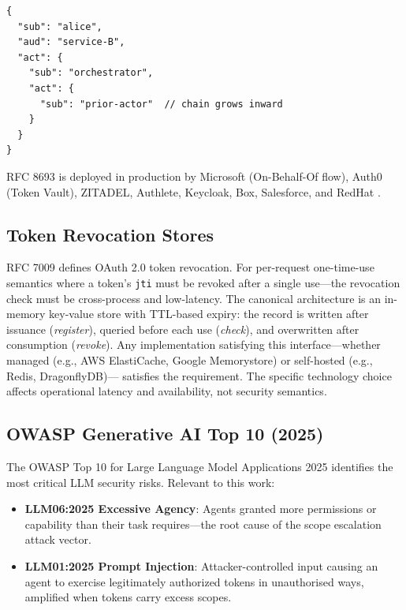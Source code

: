 \documentclass[journal]{IEEEtran}
\begin{document}
\begin{lstlisting}[language={},caption={Nested act claim per RFC 8693 \S 4.1},
                   label={lst:actchain}]
{
  "sub": "alice",
  "aud": "service-B",
  "act": {
    "sub": "orchestrator",
    "act": {
      "sub": "prior-actor"  // chain grows inward
    }
  }
}
\end{lstlisting}

RFC 8693 is deployed in production by Microsoft (On-Behalf-Of flow), Auth0
(Token Vault), ZITADEL, Authlete, Keycloak, Box, Salesforce, and
RedHat \cite{rfc8693_deploy}.

\subsection{Token Revocation Stores}

RFC 7009 \cite{rfc7009} defines OAuth 2.0 token revocation. For per-request
one-time-use semantics where a token's \texttt{jti} must be revoked after a
single use---the revocation check must be cross-process and low-latency. The
canonical architecture is an in-memory key-value store with TTL-based expiry:
the record is written after issuance (\textit{register}), queried before each
use (\textit{check}), and overwritten after consumption (\textit{revoke}). Any
implementation satisfying this interface---whether managed (e.g., AWS
ElastiCache, Google Memorystore) or self-hosted (e.g., Redis, DragonflyDB)---
satisfies the requirement. The specific technology choice affects operational
latency and availability, not security semantics.

\subsection{OWASP Generative AI Top 10 (2025)}

The OWASP Top 10 for Large Language Model Applications 2025 \cite{owasp_genai}
identifies the most critical LLM security risks. Relevant to this work:
\begin{itemize}
  \item \textbf{LLM06:2025 Excessive Agency}: Agents granted more permissions
        or capability than their task requires---the root cause of the scope
        escalation attack vector.
  \item \textbf{LLM01:2025 Prompt Injection}: Attacker-controlled input causing
        an agent to exercise legitimately authorized tokens in unauthorised ways,
        amplified when tokens carry excess scopes.
\end{itemize}
\end{document}
